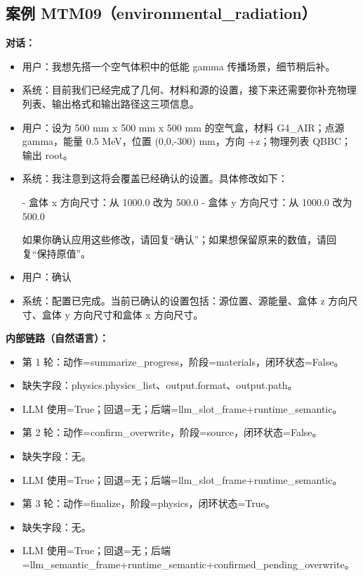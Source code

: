 \documentclass[11pt]{ctexart}
\begin{document}
\subsection{案例 MTM09（environmental\_radiation）}
\textbf{对话：}
\begin{itemize}
\item 用户：我想先搭一个空气体积中的低能 gamma 传播场景，细节稍后补。
\item 系统：目前我们已经完成了几何、材料和源的设置，接下来还需要你补充物理列表、输出格式和输出路径这三项信息。
\item 用户：设为 500 mm x 500 mm x 500 mm 的空气盒，材料 G4\_AIR；点源 gamma，能量 0.5 MeV，位置 (0,0,-300) mm，方向 +z；物理列表 QBBC；输出 root。
\item 系统：我注意到这将会覆盖已经确认的设置。具体修改如下：

- 盒体 x 方向尺寸：从 1000.0 改为 500.0
- 盒体 y 方向尺寸：从 1000.0 改为 500.0

如果你确认应用这些修改，请回复“确认”；如果想保留原来的数值，请回复“保持原值”。
\item 用户：确认
\item 系统：配置已完成。当前已确认的设置包括：源位置、源能量、盒体 z 方向尺寸、盒体 y 方向尺寸和盒体 x 方向尺寸。
\end{itemize}
\textbf{内部链路（自然语言）：}
\begin{itemize}
\item 第 1 轮：动作=summarize\_progress，阶段=materials，闭环状态=False。
\item 缺失字段：physics.physics\_list、output.format、output.path。
\item LLM 使用=True；回退=无；后端=llm\_slot\_frame+runtime\_semantic。
\item 第 2 轮：动作=confirm\_overwrite，阶段=source，闭环状态=False。
\item 缺失字段：无。
\item LLM 使用=True；回退=无；后端=llm\_slot\_frame+runtime\_semantic。
\item 第 3 轮：动作=finalize，阶段=physics，闭环状态=True。
\item 缺失字段：无。
\item LLM 使用=True；回退=无；后端=llm\_semantic\_frame+runtime\_semantic+confirmed\_pending\_overwrite。
\end{itemize}
\end{document}
